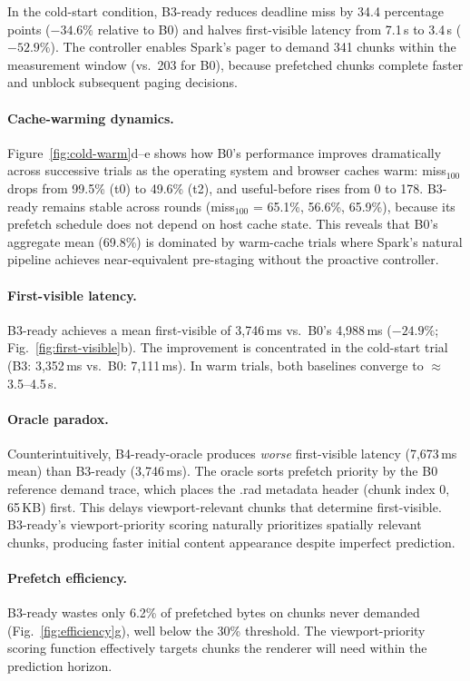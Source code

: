 In the cold-start condition, B3-ready reduces deadline miss by 34.4
percentage points ($-34.6\%$ relative to B0) and halves first-visible latency
from 7.1\,s to 3.4\,s ($-52.9\%$). The controller enables Spark's pager to
demand 341 chunks within the measurement window (vs.\ 203 for B0), because
prefetched chunks complete faster and unblock subsequent paging decisions.

\paragraph{Cache-warming dynamics.}
Figure~\ref{fig:cold-warm}d--e shows how B0's performance improves
dramatically across successive trials as the operating system and browser
caches warm: miss$_{100}$ drops from 99.5\% (t0) to 49.6\% (t2), and
useful-before rises from 0 to 178. B3-ready remains stable across rounds
(miss$_{100}$ = 65.1\%, 56.6\%, 65.9\%), because its prefetch schedule does
not depend on host cache state. This reveals that B0's aggregate mean
(69.8\%) is dominated by warm-cache trials where Spark's natural pipeline
achieves near-equivalent pre-staging without the proactive controller.

\paragraph{First-visible latency.}
B3-ready achieves a mean first-visible of 3{,}746\,ms vs.\ B0's 4{,}988\,ms
($-24.9\%$; Fig.~\ref{fig:first-visible}b). The improvement is concentrated
in the cold-start trial (B3: 3{,}352\,ms vs.\ B0: 7{,}111\,ms). In warm
trials, both baselines converge to $\approx$3.5--4.5\,s.

\paragraph{Oracle paradox.}
Counterintuitively, B4-ready-oracle produces \emph{worse} first-visible
latency (7{,}673\,ms mean) than B3-ready (3{,}746\,ms). The oracle sorts
prefetch priority by the B0 reference demand trace, which places the .rad
metadata header (chunk index 0, 65\,KB) first. This delays viewport-relevant
chunks that determine first-visible. B3-ready's viewport-priority scoring
naturally prioritizes spatially relevant chunks, producing faster initial
content appearance despite imperfect prediction.

\paragraph{Prefetch efficiency.}
B3-ready wastes only 6.2\% of prefetched bytes on chunks never demanded
(Fig.~\ref{fig:efficiency}g), well below the 30\% threshold. The
viewport-priority scoring function effectively targets chunks the renderer
will need within the prediction horizon.

